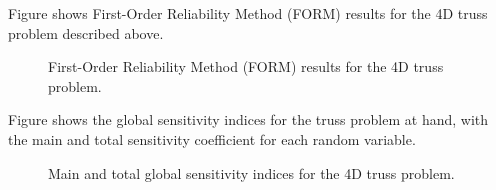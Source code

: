 
Figure  shows First-Order Reliability Method (FORM) results for the 4D truss problem described above. 


\begin{figure}[!htbp]
  \caption{First-Order Reliability Method (FORM) results for the 4D truss problem.}
  \label{fig:resultform}
\end{figure}

Figure  shows the global sensitivity indices for the truss problem at hand, with the main and total sensitivity coefficient for each random variable. 

\begin{figure}[!htbp]
  \caption{Main and total global sensitivity indices for the 4D truss problem. }
  \label{fig:resultgsa}
\end{figure}